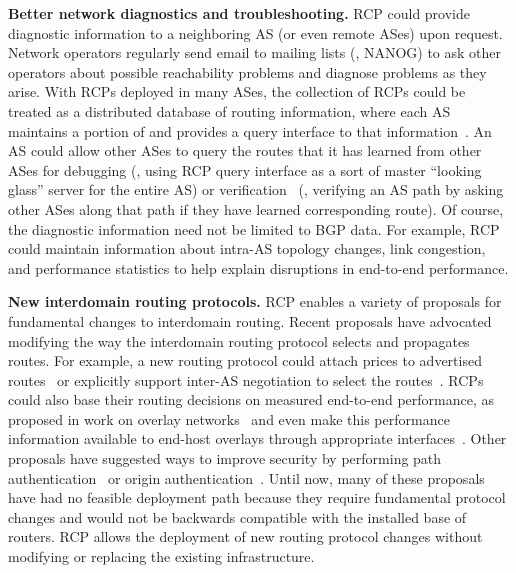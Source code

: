 {\bf Better network diagnostics and troubleshooting.}  RCP could
provide diagnostic information to a neighboring AS (or even remote ASes)
upon request.  Network operators regularly send email to
mailing lists (\eg, NANOG) to ask other operators about possible
reachability problems and diagnose problems as they arise.  With RCPs
deployed in many ASes, the collection of RCPs could be treated as a
distributed database of routing information, where each AS maintains a
portion of and provides a query interface to that
information~\cite{Teixeira2004}. 
An AS
could allow other ASes to query the routes that it has learned from
other ASes for debugging (\ie, using RCP query interface as a
sort of master ``looking glass'' server for the entire AS) or
verification~\cite{Feamster2003b} (\eg, verifying an AS path by
asking other ASes along that path if they have learned corresponding
route).
%
Of course, the diagnostic information need not be limited to BGP
data.  For example, RCP could maintain information
about intra-AS topology changes, link congestion, and performance
statistics to help explain disruptions in end-to-end performance.

{\bf New interdomain routing protocols.}  RCP
enables a variety of proposals for fundamental changes
to interdomain routing.  Recent proposals have advocated
modifying the way the interdomain routing protocol selects and
propagates routes. For example, a new routing protocol could attach
prices to advertised routes~\cite{Feigenbaum2002} or explicitly
support inter-AS negotiation to select the routes~\cite{mahajan2005}.
RCPs could also base their routing decisions on measured
end-to-end performance, as proposed in work on overlay
networks~\cite{Andersen01} and even make this performance information
available to end-host overlays through appropriate
interfaces~\cite{Nakao2003}.
%
Other proposals have suggested ways to improve security by performing
path authentication~\cite{Subramanian2004} or origin
authentication~\cite{Aiello2003}.  Until now, many of these proposals
have had no feasible deployment path because they require fundamental
protocol changes and would not be backwards compatible with the
installed base of routers.  RCP allows the deployment of new routing
protocol changes without modifying or replacing the existing infrastructure.


